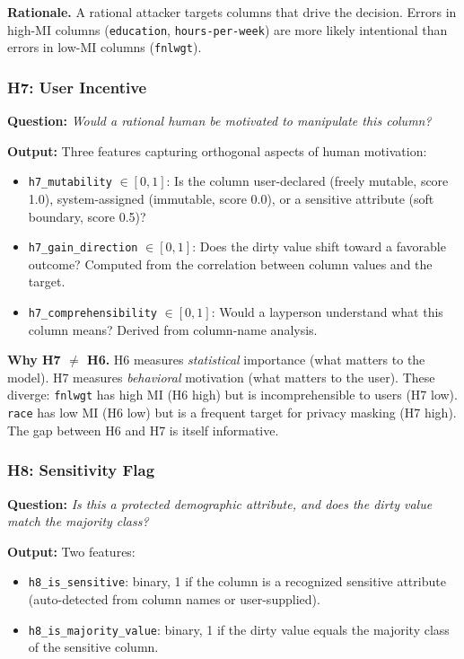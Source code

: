 \documentclass[11pt,a4paper]{article}
\newcommand{\feat}[1]{\texttt{#1}}
\begin{document}
\textbf{Rationale.}
A rational attacker targets columns that drive the decision.  Errors in
high-MI columns (\texttt{education}, \texttt{hours-per-week}) are more
likely intentional than errors in low-MI columns (\texttt{fnlwgt}).

\subsubsection{H7: User Incentive}

\textbf{Question:} \emph{Would a rational human be motivated to manipulate this column?}

\textbf{Output:} Three features capturing orthogonal aspects of human motivation:
\begin{itemize}[nosep]
  \item \feat{h7\_mutability} $\in [0,1]$: Is the column user-declared (freely
        mutable, score 1.0), system-assigned (immutable, score 0.0), or a
        sensitive attribute (soft boundary, score 0.5)?
  \item \feat{h7\_gain\_direction} $\in [0,1]$: Does the dirty value shift
        toward a favorable outcome?  Computed from the correlation between
        column values and the target.
  \item \feat{h7\_comprehensibility} $\in [0,1]$: Would a layperson understand
        what this column means?  Derived from column-name analysis.
\end{itemize}

\textbf{Why H7 $\neq$ H6.}
H6 measures \emph{statistical} importance (what matters to the model).
H7 measures \emph{behavioral} motivation (what matters to the user).
These diverge:
\texttt{fnlwgt} has high MI (H6 high) but is incomprehensible to users (H7 low).
\texttt{race} has low MI (H6 low) but is a frequent target for privacy masking
(H7 high).  The gap between H6 and H7 is itself informative.

\subsubsection{H8: Sensitivity Flag}

\textbf{Question:} \emph{Is this a protected demographic attribute, and does
the dirty value match the majority class?}

\textbf{Output:} Two features:
\begin{itemize}[nosep]
  \item \feat{h8\_is\_sensitive}: binary, 1 if the column is a recognized
        sensitive attribute (auto-detected from column names or user-supplied).
  \item \feat{h8\_is\_majority\_value}: binary, 1 if the dirty value equals
        the majority class of the sensitive column.
\end{itemize}
\end{document}

